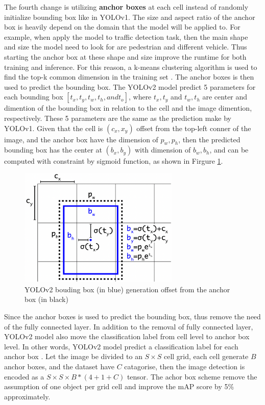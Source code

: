 The fourth change is utilizing \textbf{anchor boxes} at each cell instead of randomly initialize bounding box like in YOLOv1. The size and aspect ratio of the anchor box is heavily depend on the domain that the model will be applied to. For example, when apply the model to traffic detection task, then the main shape and size the model need to look for are pedestrian and different vehicle. Thus starting the anchor box at these shape and size improve the runtime for both training and inference. For this reason, a k-means clustering algorithm is used to find the top-k common dimension in the training set \cite{yolo9000_2017}. The anchor boxes is then used to predict the bounding box. The YOLOv2 model predict 5 parameters for each bounding box $[t_x, t_y, t_w, t_h, and t_o]$, where $t_x, t_y$ and $t_w, t_h$ are center and dimention of the bounding box in relation to the cell and the image dimention, respectively. These 5 parameters are the same as the prediction make by YOLOv1. Given that the cell is $(c_x, x_y)$ offset from the top-left conner of the image, and the anchor box have the dimension of $p_w, p_h$, then the predicted bounding box  has the center at $(b_x, b_y)$ with dimension of $b_w, b_h$, and can be computed with constraint by sigmoid function, as shown in Firgure \ref{fig:yolov2_bbox}.

\begin{figure}[!ht]
    \centering
    \includegraphics[width=3in]{figures/yolov2_bbox.png}
    \caption{YOLOv2 bouding box (in blue) generation offset from the anchor box (in black) \cite{yolo9000_2017}} 
    \label{fig:yolov2_bbox}
\end{figure}

Since the anchor boxes is used to predict the bounding box, thus remove the need of the fully connected layer. In addition to the removal of fully connected layer, YOLOv2 model also move the classification label from cell level to anchor box level. In other words, YOLOv2 model predict a classification label for each anchor box \cite{yolo9000_2017}. Let the image be divided to an $S \times S$ cell grid, each cell generate $B$ anchor boxes, and the dataset have $C$ catagorise, then the image detection is encoded as a $S \times S \times B*(4+1+C)$ tensor. The achor box scheme remove the assumption of one object per grid cell and improve the mAP score by 5\% approximately.

